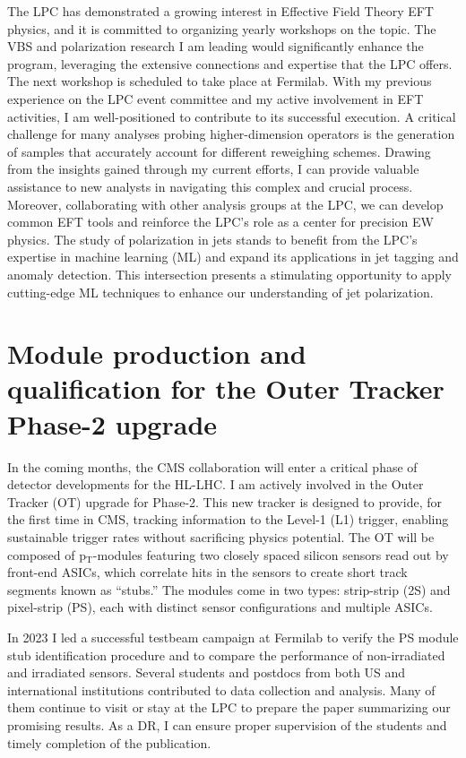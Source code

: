 {\begin{flushleft}
The LPC has demonstrated a growing interest in Effective Field Theory EFT physics, and it is committed to organizing yearly workshops on the topic. The VBS and polarization research I am leading would significantly enhance the program, leveraging the extensive connections and expertise that the LPC offers.
The next workshop is scheduled to take place at Fermilab. With my previous experience on the LPC event committee and my active involvement in EFT activities, I am well-positioned to contribute to its successful execution.
A critical challenge for many analyses probing higher-dimension operators is the generation of samples that accurately account for different reweighing schemes. Drawing from the insights gained through my current efforts, I can provide valuable assistance to new analysts in navigating this complex and crucial process. Moreover, collaborating with other analysis groups at the LPC, we can develop common EFT tools and reinforce the LPC's role as a center for precision EW physics.
The study of polarization in jets stands to benefit from the LPC's expertise in machine learning (ML) and expand its applications in jet tagging and anomaly detection. This intersection presents a stimulating opportunity to apply cutting-edge ML techniques to enhance our understanding of jet polarization.


\section{Module production and qualification for the Outer Tracker Phase-2 upgrade}
\vspace{\baselineskip}
In the coming months, the CMS collaboration will enter a critical phase of detector developments for the HL-LHC.  I am actively involved in the Outer Tracker (OT) upgrade for Phase-2. This new tracker is designed to provide, for the first time in CMS, tracking information to the Level-1 (L1) trigger, enabling sustainable trigger rates without sacrificing physics potential. The OT will be composed of p$_{\mathrm{T}}$-modules featuring two closely spaced silicon sensors read out by front-end ASICs, which correlate hits in the sensors to create short track segments known as ``stubs.'' The modules come in two types: strip-strip (2S) and pixel-strip (PS), each with distinct sensor configurations and multiple ASICs.

In 2023 I led a successful testbeam campaign at Fermilab to verify the PS module stub identification procedure and to compare the performance of non-irradiated and irradiated sensors. Several students and postdocs from both US and international institutions contributed to data collection and analysis. Many of them continue to visit or stay at the LPC to prepare the paper summarizing our promising results. As a DR, I can ensure proper supervision of the students and timely completion of the publication.


\end{flushleft}}
